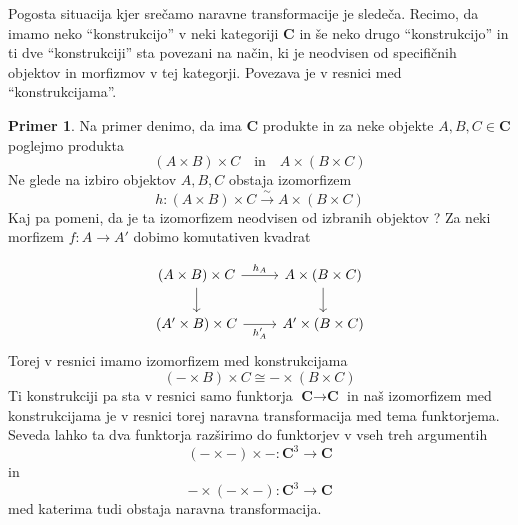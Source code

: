 \documentclass[12pt,a4paper]{book}
\theoremstyle{definition}
\theoremstyle{plain}
\theoremstyle{definition}
\newtheorem{primer}{Primer}[section]
\theoremstyle{remark}
\newcommand{\cat}[1]{\textbf{#1}}
\begin{document}
Pogosta situacija kjer srečamo naravne transformacije je sledeča. Recimo, da imamo neko "`konstrukcijo"' v neki kategoriji \cat{C} in še neko drugo "`konstrukcijo"' in ti dve "`konstrukciji"' sta povezani na način, ki je neodvisen od specifičnih objektov in morfizmov v tej kategorji. Povezava je v resnici med "`konstrukcijama"'. 
\begin{primer}
Na primer denimo, da ima \cat{C} produkte in za neke objekte $A,B,C \in \cat{C}$ poglejmo produkta
$$(A \times B) \times C \quad \text{in} \quad A \times (B \times C)$$
Ne glede na izbiro objektov $A,B,C$ obstaja izomorfizem
$$h : (A \times B) \times C \xrightarrow{\sim} A \times (B \times C)$$
Kaj pa pomeni, da je ta izomorfizem neodvisen od izbranih objektov ? Za neki morfizem $f : A \to A'$ dobimo komutativen kvadrat

$$ \begin{tikzcd}
(A \times B) \times C \ar[r, "h_A"] \ar[d] & A \times (B \times C) \ar[d] \\
(A' \times B) \times C \ar[r, "h_A'"'] & A' \times (B \times C) 
\end{tikzcd} $$
Torej v resnici imamo izomorfizem med konstrukcijama 
$$(- \times B) \times C \cong - \times (B \times C)$$
Ti konstrukciji pa sta v resnici samo funktorja $\cat{C} \to \cat{C}$ in naš izomorfizem med konstrukcijama je v resnici torej naravna transformacija med tema funktorjema. Seveda lahko ta dva funktorja razširimo do funktorjev v vseh treh argumentih
$$(- \times -) \times - : \cat{C}^3 \to \cat{C}$$
in
$$ - \times (- \times -) : \cat{C}^3 \to \cat{C}$$
med katerima tudi obstaja naravna transformacija.
\end{primer}
\end{document}
